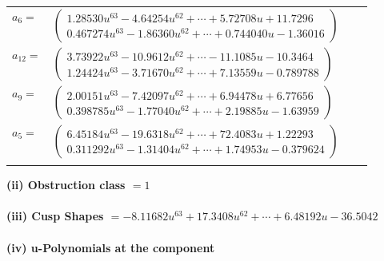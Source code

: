 \documentclass[1p]{elsarticle_modified}
\theoremstyle{definition}
\begin{document}
\begin{tabular}{m{7pt} m{180pt} m{7pt} m{180pt} }
\flushright $a_{6}=$&$\begin{pmatrix}1.28530 u^{63}-4.64254 u^{62}+\cdots+5.72708 u+11.7296\\0.467274 u^{63}-1.86360 u^{62}+\cdots+0.744040 u-1.36016\end{pmatrix}$ \\
\flushright $a_{12}=$&$\begin{pmatrix}3.73922 u^{63}-10.9612 u^{62}+\cdots-11.1085 u-10.3464\\1.24424 u^{63}-3.71670 u^{62}+\cdots+7.13559 u-0.789788\end{pmatrix}$ \\
\flushright $a_{9}=$&$\begin{pmatrix}2.00151 u^{63}-7.42097 u^{62}+\cdots+6.94478 u+6.77656\\0.398785 u^{63}-1.77040 u^{62}+\cdots+2.19885 u-1.63959\end{pmatrix}$ \\
\flushright $a_{5}=$&$\begin{pmatrix}6.45184 u^{63}-19.6318 u^{62}+\cdots+72.4083 u+1.22293\\0.311292 u^{63}-1.31404 u^{62}+\cdots+1.74953 u-0.379624\end{pmatrix}$\\&\end{tabular}
\flushleft \textbf{(ii) Obstruction class $= 1$}\\~\\
\flushleft \textbf{(iii) Cusp Shapes $= -8.11682 u^{63}+17.3408 u^{62}+\cdots+6.48192 u-36.5042$}\\~\\
\newpage\renewcommand{\arraystretch}{1}
\flushleft \textbf{(iv) u-Polynomials at the component}\newline \\
\end{document}
